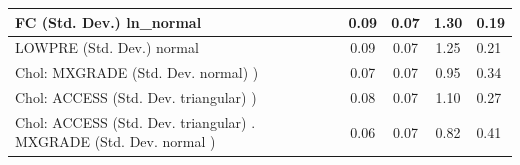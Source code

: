 \begin{table}
\begin{center}
\begin{tabular}{|l|l|c|c|c|l|}
			\hline
			FC (Std. Dev.) ln_normal &  & 0.09 & 0.07 & 1.30 & 0.19 \\
			\hline
			LOWPRE (Std. Dev.) normal &  & 0.09 & 0.07 & 1.25 & 0.21 \\
			\hline
			 Chol: MXGRADE (Std. Dev. normal) ) &  & 0.07 & 0.07 & 0.95 & 0.34 \\
			\hline
			 Chol: ACCESS (Std. Dev. triangular) ) &  & 0.08 & 0.07 & 1.10 & 0.27 \\
			\hline
			 Chol: ACCESS (Std. Dev. triangular) . MXGRADE (Std. Dev.   normal ) &  & 0.06 & 0.07 & 0.82 & 0.41 \\
			\hline
		\end{tabular}
	\end{center}
\end{table}